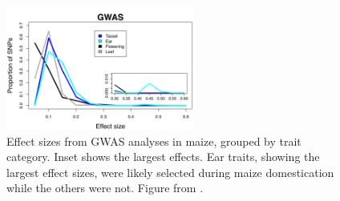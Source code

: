 


\vspace{-0.4cm}

\begin{figure}
\centering
   \includegraphics[width=0.55\textwidth]{Figure2_Brownetal2011.png}
  \caption{Effect sizes from GWAS analyses in maize, grouped by trait category. Inset shows the largest effects. Ear traits, showing the largest effect sizes, were likely selected during maize domestication while the others were not. Figure from \citealt{Brown:2011}.}
  \label{fig:model}
\end{figure}

